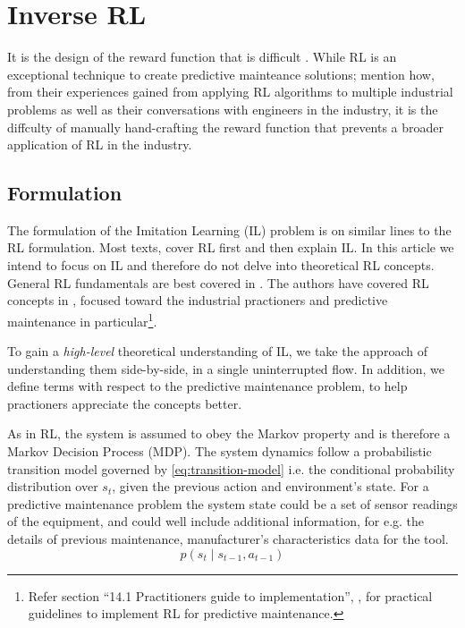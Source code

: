 \documentclass{article}
\begin{document}
\section{Inverse RL}

It is the design of the reward function that is difficult \citep{abbeel2004apprenticeship, ng2000algorithms}.
While RL is an exceptional technique to create predictive mainteance solutions; \cite{abbeel2004apprenticeship} mention how, from their experiences gained from applying RL algorithms to multiple industrial problems as well as their conversations with engineers in the industry, it is the diffculty of manually hand-crafting the reward function that prevents a broader application of RL in the industry.

\subsection{Formulation} 

The formulation of the Imitation Learning (IL) problem is on similar lines to the RL formulation. Most texts, cover RL first and then explain IL. In this article we intend to focus on IL and therefore do not delve into theoretical RL concepts. General RL fundamentals are best covered in \citep{sutton2018, stanford-lectures}. The authors have covered RL concepts in \cite{siraskar2023}, focused toward the industrial practioners and predictive maintenance in particular\footnote{Refer section ``14.1 Practitioners guide to implementation'', \citep{siraskar2023}, for practical guidelines to implement RL for predictive maintenance.}.  

To gain a \textit{high-level} theoretical understanding of IL, we take the approach of understanding them side-by-side, in a single uninterrupted flow. In addition, we define terms with respect to the predictive maintenance problem, to help practioners appreciate the concepts better. 

As in RL, the system is assumed to obey the Markov property and is therefore a Markov Decision Process (MDP). The system dynamics follow a probabilistic transition model governed by \eqref{eq:transition-model} i.e. the conditional probability distribution over $s_t$, given the previous action and environment's state. For a predictive maintenance problem the system state could be a set of sensor readings of the equipment, and could well include additional information, for e.g. the details of previous maintenance, manufacturer's characteristics data for the tool.
\begin{equation}\label{eq:transition-model}
	p(s_t \mid s_{t-1}, a_{t-1})
\end{equation}
\end{document}
